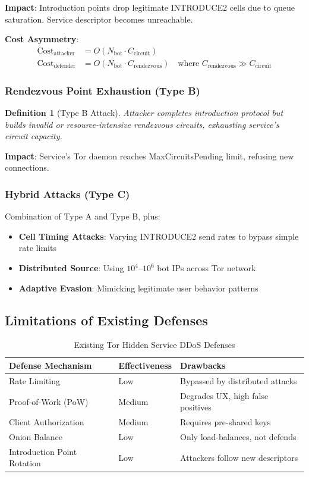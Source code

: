 \documentclass[11pt,a4paper]{article}
\newtheorem{definition}{Definition}[section]
\begin{document}
\textbf{Impact}: Introduction points drop legitimate INTRODUCE2 cells due to queue saturation. Service descriptor becomes unreachable.

\textbf{Cost Asymmetry}:
\begin{align}
\text{Cost}_{\text{attacker}} &= O(N_{\text{bot}} \cdot C_{\text{circuit}}) \\
\text{Cost}_{\text{defender}} &= O(N_{\text{bot}} \cdot C_{\text{rendezvous}}) \quad \text{where } C_{\text{rendezvous}} \gg C_{\text{circuit}}
\end{align}

\subsubsection{Rendezvous Point Exhaustion (Type B)}

\begin{definition}[Type B Attack]
Attacker completes introduction protocol but builds invalid or resource-intensive rendezvous circuits, exhausting service's circuit capacity.
\end{definition}

\textbf{Impact}: Service's Tor daemon reaches MaxCircuitsPending limit, refusing new connections.

\subsubsection{Hybrid Attacks (Type C)}

Combination of Type A and Type B, plus:
\begin{itemize}
\item \textbf{Cell Timing Attacks}: Varying INTRODUCE2 send rates to bypass simple rate limits
\item \textbf{Distributed Source}: Using $10^4$--$10^6$ bot IPs across Tor network
\item \textbf{Adaptive Evasion}: Mimicking legitimate user behavior patterns
\end{itemize}

\subsection{Limitations of Existing Defenses}

\begin{table}[h]
\centering
\begin{tabular}{@{}lll@{}}
\toprule
\textbf{Defense Mechanism} & \textbf{Effectiveness} & \textbf{Drawbacks} \\ \midrule
Rate Limiting & Low & Bypassed by distributed attacks \\
Proof-of-Work (PoW) & Medium & Degrades UX, high false positives \\
Client Authorization & Medium & Requires pre-shared keys \\
Onion Balance & Low & Only load-balances, not defends \\
Introduction Point Rotation & Low & Attackers follow new descriptors \\
\bottomrule
\end{tabular}
\caption{Existing Tor Hidden Service DDoS Defenses}
\end{table}
\end{document}
